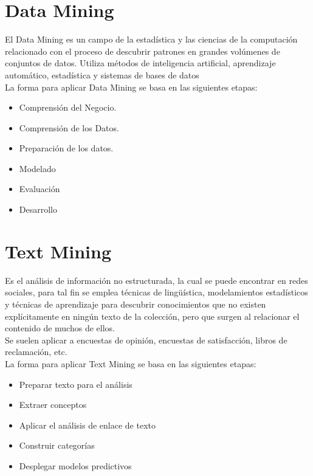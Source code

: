 	 	
		
		
		



\section{Data Mining}

El Data Mining es un campo de la estad\'istica y las ciencias de la computaci\'on relacionado con el proceso de descubrir patrones en grandes vol\'umenes de conjuntos de datos. Utiliza m\'etodos de inteligencia artificial, aprendizaje autom\'atico, estad\'istica y sistemas de bases de datos \\	

La forma para aplicar Data Mining se basa en las siguientes etapas:

\begin{itemize}
\item Comprensión del Negocio.
\item Comprensión de los Datos.
\item Preparación de los datos.
\item Modelado
\item Evaluación 
\item Desarrollo
\end{itemize}

\section{Text Mining}

Es el an\'alisis de informaci\'on no estructurada, la cual se puede encontrar en redes sociales, para tal fin se emplea t\'ecnicas de ling\"uística, modelamientos estad\'isticos y t\'ecnicas de aprendizaje para descubrir conocimientos que no existen explícitamente en ning\'un texto de la colecci\'on, pero que surgen al relacionar el contenido de muchos de ellos. \\

Se suelen aplicar a encuestas de opini\'on, encuestas de satisfacci\'on, libros de reclamaci\'on, etc. \\

La forma para aplicar Text Mining se basa en las siguientes etapas:

\begin{itemize}
\item Preparar texto para el análisis
\item Extraer conceptos
\item Aplicar el análisis de enlace de texto
\item Construir categorías
\item Desplegar modelos predictivos
\end{itemize}

